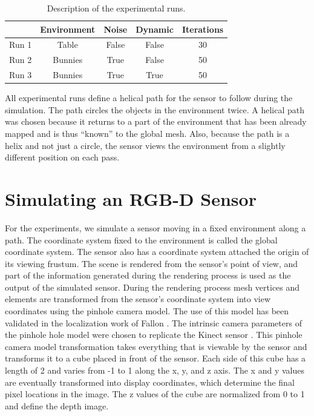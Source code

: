 \begin{table}[h]
  \caption{Description of the experimental runs.}
  \label{tab:run}
  \begin{footnotesize}
  \begin{center}
    \begin{tabular}{|l|c|c|c|c|}
    \hline
           & Environment & Noise   & Dynamic & Iterations \\\hline
    Run 1	 & Table       & False   & False   & 30 \\
    Run 2  & Bunnies     & True    & False   & 50 \\
    Run 3  & Bunnies     & True    & True    & 50 \\
    \hline
    \end{tabular}
  \end{center}
  \end{footnotesize}
\end{table}

All experimental runs define a helical path for the sensor to follow during the
simulation. The path circles the objects in the environment twice. A helical
path was chosen because it returns to a part of the environment that has been
already mapped and is thus ``known'' to the global mesh. Also, because the path
is a helix and not just a circle, the sensor views the environment from a
slightly different position on each pass.

\section{Simulating an RGB-D Sensor}

For the experiments, we simulate a sensor moving in a fixed environment along a
path. The coordinate system fixed to the environment is called the global
coordinate system. The sensor also has a coordinate system attached the origin
of its viewing frustum. The scene is rendered from the sensor's point of view,
and part of the information generated during the rendering process is used as
the output of the simulated sensor. During the rendering process mesh vertices
and elements are transformed from the sensor's coordinate system into view
coordinates using the pinhole camera model. The use of this model has been
validated in the localization work of Fallon \cite{Fallon2012}. The intrinsic
camera parameters of the pinhole hole model were chosen to replicate the Kinect
sensor \cite{sitekinectspecs}. This pinhole camera model transformation takes
everything that is viewable by the sensor and transforms it to a cube placed in
front of the sensor. Each side of this cube has a length of 2 and varies from -1
to 1 along the x, y, and z axis. The x and y values are eventually transformed
into display coordinates, which determine the final pixel locations in the
image. The z values of the cube are normalized from 0 to 1 and define the depth
image.

